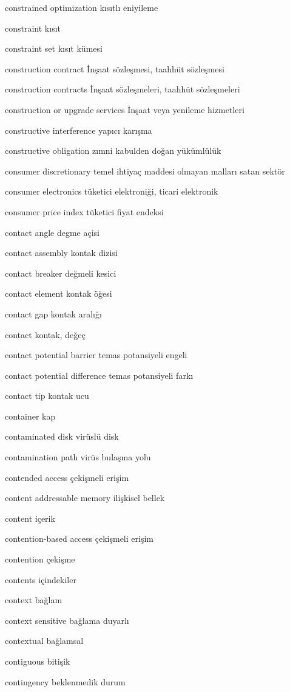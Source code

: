 \documentclass[12pt,fleqn]{article}\usepackage{../../common}
\begin{document}
constrained optimization kısıtlı eniyileme

constraint kısıt

constraint set kısıt kümesi

construction contract İnşaat sözleşmesi, taahhüt sözleşmesi

construction contracts İnşaat sözleşmeleri, taahhüt sözleşmeleri

construction or upgrade services İnşaat veya yenileme hizmetleri

constructive interference yapıcı karışma

constructive obligation zımni kabulden doğan yükümlülük

consumer discretionary temel ihtiyaç maddesi olmayan malları satan sektör

consumer electronics tüketici elektroniği, ticari elektronik

consumer price index tüketici fiyat endeksi

contact angle degme açisi

contact assembly kontak dizisi

contact breaker değmeli kesici

contact element kontak öğesi

contact gap kontak aralığı

contact kontak, değeç

contact potential barrier temas potansiyeli engeli

contact potential difference temas potansiyeli farkı

contact tip kontak ucu

container kap

contaminated disk virüslü disk

contamination path virüs bulaşma yolu

contended access çekişmeli erişim

content addressable memory ilişkisel bellek

content içerik

contention-based access çekişmeli erişim

contention çekişme

contents içindekiler

context bağlam

context sensitive bağlama duyarlı

contextual bağlamsal

contiguous bitişik

contingency beklenmedik durum
\end{document}
